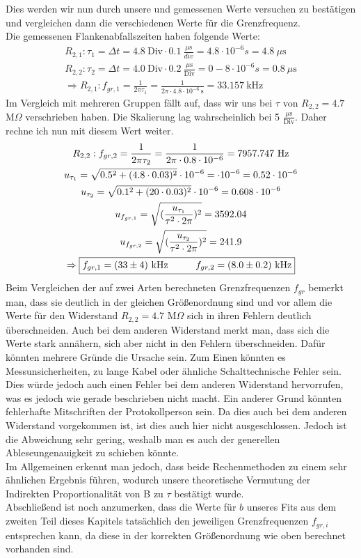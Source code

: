 Dies werden wir nun durch unsere und gemessenen Werte versuchen zu bestätigen und vergleichen dann die verschiedenen Werte für die Grenzfrequenz. \\
Die gemessenen Flankenabfallszeiten haben folgende Werte:
\begin{gather}
    R_{2,1}:\tau_1=\Delta t =4.8~\text{Div} \cdot 0.1~\frac{\mu\text{s}}{div}=4.8\cdot10^{-6}s=4.8~\mu\text{s}\\
    R_{2,2}:\tau_2=\Delta t =4.0~\text{Div} \cdot 0.2~\frac{\mu\text{s}}{\text{Div}}=0-8\cdot10^{-6}s= 0.8~\mu\text{s}\\
    \Rightarrow R_{2,1}: f_{gr,1}=\frac{1}{2\pi \tau_1}= \frac{1}{2\pi \cdot 4.8\cdot 10^{-6}~\text{s}}=33.157~\text{kHz}
\end{gather}
Im Vergleich mit mehreren Gruppen fällt auf, dass wir uns bei $\tau$ von $R_{2,2}=4.7$ M$\Omega$ verschrieben haben. Die Skalierung lag wahrscheinlich bei 5 $\frac{\mu\text{s}}{\text{Div}}$. Daher rechne ich nun mit diesem Wert weiter. 
\begin{gather}
    R_{2,2}: f_{gr,2}=\frac{1}{2\pi \tau_2}= \frac{1}{2\pi \cdot 0.8 \cdot 10^{-6}}=7957.747~\text{Hz}\\
    u_{\tau_1}=\sqrt{0.5^2+(4.8\cdot0.03)^2}\cdot10^{-6}=\cdot10^{-6}=0.52\cdot10^{-6}\\
    u_{\tau_2}=\sqrt{0.1^2+(20\cdot0.03)^2}\cdot10^{-6}=0.608\cdot10^{-6}\\
    u_{f_{gr,1}}=\sqrt{(\frac{u_{\tau_1}}{\tau^2 \cdot 2\pi})^2}= 3592.04\\
    u_{f_{gr,2}}=\sqrt{(\frac{u_{\tau_2}}{\tau^2 \cdot 2\pi})^2}= 241.9\\
    \Rightarrow\boxed{
    f_{gr,1}=(33\pm4)~\text{kHz} \tab f_{gr,2}=(8.0\pm0.2)~\text{kHz}
    }
\end{gather}
Beim Vergleichen der auf zwei Arten berechneten Grenzfrequenzen $f_{gr}$ bemerkt man, dass sie deutlich in der gleichen Größenordnung sind und vor allem die Werte für den Widerstand $R_{2,2}=4.7 $ M$\Omega$ sich in ihren Fehlern deutlich überschneiden. Auch bei dem anderen Widerstand merkt man, dass sich die Werte stark annähern, sich aber nicht in den Fehlern überschneiden. Dafür könnten mehrere Gründe die Ursache sein. Zum Einen könnten es Messunsicherheiten, zu lange Kabel oder ähnliche Schalttechnische Fehler sein. Dies würde jedoch auch einen Fehler bei dem anderen Widerstand hervorrufen, was es jedoch wie gerade beschrieben nicht macht. Ein anderer Grund könnten fehlerhafte Mitschriften der Protokollperson sein. Da dies auch bei dem anderen Widerstand vorgekommen ist, ist dies auch hier nicht ausgeschlossen. Jedoch ist die Abweichung sehr gering, weshalb man es auch der generellen Ableseungenauigkeit zu schieben könnte. \\
Im Allgemeinen erkennt man jedoch, dass beide Rechenmethoden zu einem sehr ähnlichen Ergebnis führen, wodurch unsere theoretische Vermutung der Indirekten Proportionalität von B zu $\tau$ bestätigt wurde.\\
\newline
Abschließend ist noch anzumerken, dass die Werte für $b$ unseres Fits aus dem zweiten Teil dieses Kapitels tatsächlich den jeweiligen Grenzfrequenzen $f_{gr,i}$ entsprechen kann, da diese in der korrekten Größenordnung wie oben berechnet vorhanden sind.
\newpage